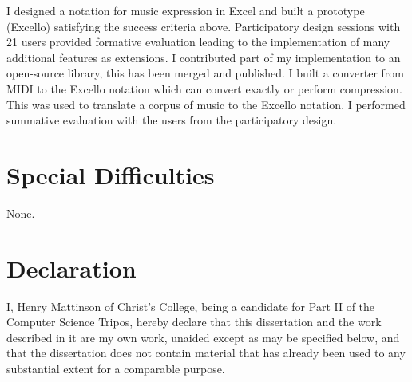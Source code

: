I designed a notation for music expression in Excel and built a prototype (Excello) satisfying the success criteria above. Participatory design sessions with 21 users provided formative evaluation leading to the implementation of many additional features as extensions. I contributed part of my implementation to an open-source library, this has been merged and published. I built a converter from MIDI to the Excello notation which can convert exactly or perform compression. This was used to translate a corpus of music to the Excello notation. I performed summative evaluation with the users from the participatory design.

\section*{Special Difficulties}

None.

\newpage
\section*{Declaration}

I, Henry Mattinson of Christ's College, being a candidate for Part II of the Computer
Science Tripos, hereby declare
that this dissertation and the work described in it are my own work,
unaided except as may be specified below, and that the dissertation
does not contain material that has already been used to any substantial
extent for a comparable purpose.

\bigskip
{}

\medskip
{}

\tableofcontents


